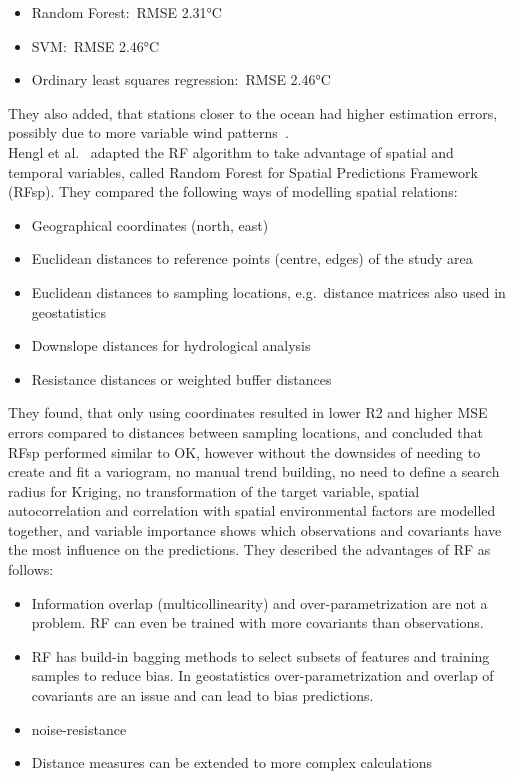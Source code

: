\begin{itemize}
    \item Random Forest:\ RMSE 2.31°C
    \item SVM:\ RMSE 2.46°C
    \item Ordinary least squares regression:\ RMSE 2.46°C
\end{itemize}

They also added, that stations closer to the ocean had higher estimation errors, possibly due to more variable wind patterns~\cite{runnalls2000dynamics}.\\
Hengl et al.~\cite{hengl2018random} adapted the RF algorithm to take advantage of spatial and temporal variables, called Random Forest for Spatial Predictions Framework (RFsp). They compared the following ways of modelling spatial relations:

\begin{itemize}
    \item Geographical coordinates (north, east)
    \item Euclidean distances to reference points (centre, edges) of the study area 
    \item Euclidean distances to sampling locations, e.g.\ distance matrices also used in geostatistics
    \item Downslope distances for hydrological analysis
    \item Resistance distances or weighted buffer distances
\end{itemize}

They found, that only using coordinates resulted in lower R2 and higher MSE errors compared to distances between sampling locations, and concluded that RFsp performed similar to OK, however without the downsides of needing to create and fit a variogram, no manual trend building, no need to define a search radius for Kriging, no transformation of the target variable, spatial autocorrelation and correlation with spatial environmental factors are modelled together, and variable importance shows which observations and covariants have the most influence on the predictions. They described the advantages of RF as follows:

\begin{itemize}
    \item Information overlap (multicollinearity) and over-parametrization are not a problem. RF can even be trained with more covariants than observations.
    \item RF has build-in bagging methods to select subsets of features and training samples to reduce bias. In geostatistics over-parametrization and overlap of covariants are an issue and can lead to bias predictions.
    \item noise-resistance~\cite{strobl2007bias}
    \item Distance measures can be extended to more complex calculations
\end{itemize}

